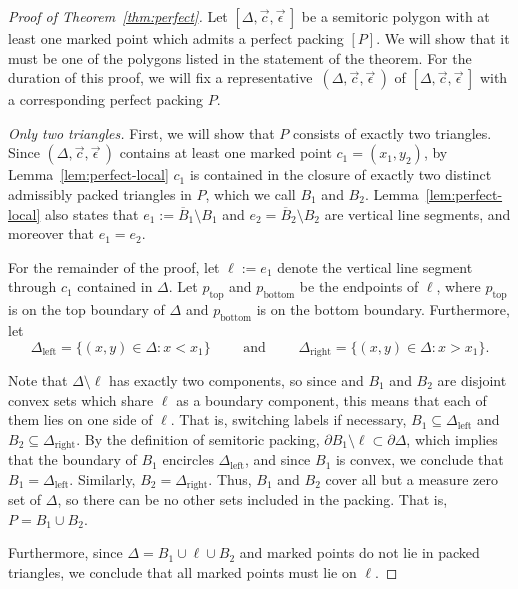 \documentclass[pdftex]{sigma}
\numberwithin{equation}{section}
\newcommand{\De}{\Delta}
\newcommand{\stpoly}{[\De,\vec{c},\vec{\epsilon}\,]}
\newcommand{\strep}{(\De,\vec{c},\vec{\epsilon}\,)}
\begin{document}
\begin{proof}[Proof of Theorem~\ref{thm:perfect}]
Let $\stpoly$ be a semitoric polygon with at least one marked point which admits a perfect packing $[P]$.
We will show that it must be one of the polygons listed in the statement of the theorem.
For the duration of this proof, we will fix a representative~$\strep$ of $\stpoly$ with a corresponding perfect packing $P$.

{\it Only two triangles.}
First, we will show that $P$ consists of exactly two triangles.
Since $\strep$ contains at least one marked point $c_1 = (x_1,y_2)$, by Lemma~\ref{lem:perfect-local} $c_1$ is contained in the closure of exactly two distinct admissibly packed triangles in $P$, which we call $B_1$ and $B_2$.
Lemma~\ref{lem:perfect-local} also states that $e_1:=\overline{B}_1\setminus B_1$ and $e_2 = \overline{B}_2\setminus B_2$ are vertical line segments, and moreover that $e_1=e_2$.

For the remainder of the proof, let $\ell :=e_1$ denote the vertical line segment through $c_1$ contained in $\De$.
Let $p_{\text{top}}$ and $p_{\text{bottom}}$ be the endpoints of $\ell$, where $p_{\text{top}}$ is on the top boundary of $\De$ and $p_{\text{bottom}}$ is on the bottom boundary.
Furthermore, let
\[
\De_{\text{left}} = \{(x,y)\in\De\colon x<x_1\} \qquad \text{ and } \qquad
\De_{\text{right}} = \{(x,y)\in\De\colon x>x_1\}.
\]

Note that $\De\setminus\ell$ has exactly two components, so since and $B_1$ and $B_2$ are disjoint convex sets which share $\ell$ as a boundary component, this means that each of them lies on one side of $\ell$. That is, switching labels if necessary, $B_1\subseteq \De_{\text{left}}$ and $B_2\subseteq \De_{\text{right}}$.
By the definition of semitoric packing, $\partial B_1 \setminus \ell \subset \partial \De$, which implies that the boundary of $B_1$ encircles $\De_{\text{left}}$, and since $B_1$ is convex, we conclude that $B_1 = \De_{\text{left}}$. Similarly, $B_2 = \De_{\text{right}}$.
Thus, $B_1$ and $B_2$ cover all but a measure zero set of $\De$, so there can be no other sets included in the packing. That is, $P = B_1 \cup B_2$.

Furthermore, since $\De = B_1 \cup \ell \cup B_2$ and marked points do not lie in packed triangles, we conclude that all marked points must lie on $\ell$.


\end{proof}
\end{document}
